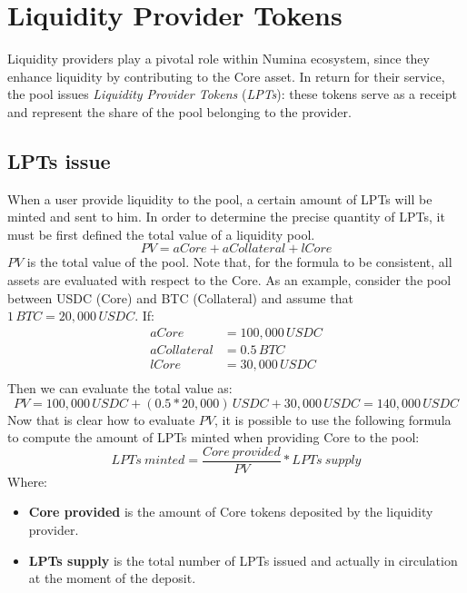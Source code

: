 \documentclass[12pt]{paper}
\begin{document}
\section{Liquidity Provider Tokens}
\label{sec:lptoken}
	Liquidity providers play a pivotal role within Numina ecosystem, since they enhance liquidity by contributing to the Core asset. In return for their service, the pool issues \textit{Liquidity Provider Tokens} (\textit{LPTs}): these tokens serve as a receipt and represent the share of the pool belonging to the provider.
	
	\subsection{LPTs issue}
	\label{subsec:issue}
		When a user provide liquidity to the pool, a certain amount of LPTs will be minted and sent to him. In order to determine the precise quantity of LPTs, it must be first defined the total value of a liquidity pool.
		\begin{equation}
			PV = aCore + aCollateral + lCore
		\end{equation}
		$PV$ is the total value of the pool. Note that, for the formula to be consistent, all assets are evaluated with respect to the Core. As an example, consider the pool between USDC (Core) and BTC (Collateral) and assume that $1 \, BTC = 20,000 \, USDC$. If:
		\begin{equation*}
			\begin{split}
				aCore &= 100,000 \, USDC\\
				aCollateral &= 0.5 \, BTC\\
				lCore &= 30,000 \, USDC\\
			\end{split}
		\end{equation*}
		Then we can evaluate the total value as:
		\begin{equation*}
			PV = 100,000 \, USDC + (0.5*20,000) \, USDC + 30,000 \, USDC = 140,000 \, USDC
		\end{equation*}
		Now that is clear how to evaluate $PV$, it is possible to use the following formula to compute the amount of LPTs minted when providing Core to the pool:
		\begin{equation}
			LPTs\ minted = \frac{Core\ provided}{PV}*LPTs\ supply
		\end{equation}
		Where:
		\begin{itemize}
			\item \textbf{Core provided} is the amount of Core tokens deposited by the liquidity provider.
			\item \textbf{LPTs supply} is the total number of LPTs issued and actually in circulation at the moment of the deposit.
		\end{itemize}
		
\end{document}

